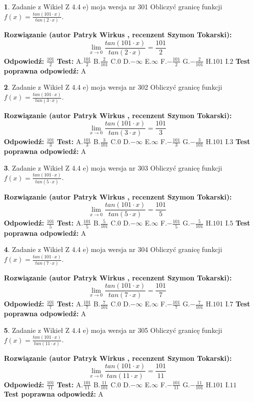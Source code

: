 \documentclass[12pt, a4paper]{article}
\theoremstyle{definition} %
\newtheorem{zad}{}
\newcommand{\zadStart}[1]{\begin{zad}#1\newline}
\newcommand{\zadStop}{\end{zad}}
\newcommand{\rozwStart}[2]{\noindent \textbf{Rozwiązanie (autor #1 , recenzent #2): }\newline}
\newcommand{\rozwStop}{\newline}
\newcommand{\odpStart}{\noindent \textbf{Odpowiedź:}\newline}
\newcommand{\odpStop}{\newline}
\newcommand{\testStart}{\noindent \textbf{Test:}\newline}
\newcommand{\testStop}{\newline}
\newcommand{\kluczStart}{\noindent \textbf{Test poprawna odpowiedź:}\newline}
\newcommand{\kluczStop}{\newline}
\begin{document}
\zadStart{Zadanie z Wikieł Z 4.4 e) moja wersja nr 301}
Obliczyć granicę funkcji $f(x)=\frac{tan(101\cdot x)}{tan(2\cdot x)}$.
\zadStop
\rozwStart{Patryk Wirkus}{Szymon Tokarski}
$$\lim\limits_{x\to 0}\frac{tan(101\cdot x)}{tan(2\cdot x)}=
\frac{101}{2}$$
\rozwStop
\odpStart
$\frac{101}{2}$
\odpStop
\testStart
A.$\frac{101}{2}$
B.$\frac{2}{101}$
C.$0$
D.$-\infty$
E.$\infty$
F.$-\frac{101}{2}$
G.$-\frac{2}{101}$
H.$101$
I.$2$
\testStop
\kluczStart
A
\kluczStop



\zadStart{Zadanie z Wikieł Z 4.4 e) moja wersja nr 302}
Obliczyć granicę funkcji $f(x)=\frac{tan(101\cdot x)}{tan(3\cdot x)}$.
\zadStop
\rozwStart{Patryk Wirkus}{Szymon Tokarski}
$$\lim\limits_{x\to 0}\frac{tan(101\cdot x)}{tan(3\cdot x)}=
\frac{101}{3}$$
\rozwStop
\odpStart
$\frac{101}{3}$
\odpStop
\testStart
A.$\frac{101}{3}$
B.$\frac{3}{101}$
C.$0$
D.$-\infty$
E.$\infty$
F.$-\frac{101}{3}$
G.$-\frac{3}{101}$
H.$101$
I.$3$
\testStop
\kluczStart
A
\kluczStop



\zadStart{Zadanie z Wikieł Z 4.4 e) moja wersja nr 303}
Obliczyć granicę funkcji $f(x)=\frac{tan(101\cdot x)}{tan(5\cdot x)}$.
\zadStop
\rozwStart{Patryk Wirkus}{Szymon Tokarski}
$$\lim\limits_{x\to 0}\frac{tan(101\cdot x)}{tan(5\cdot x)}=
\frac{101}{5}$$
\rozwStop
\odpStart
$\frac{101}{5}$
\odpStop
\testStart
A.$\frac{101}{5}$
B.$\frac{5}{101}$
C.$0$
D.$-\infty$
E.$\infty$
F.$-\frac{101}{5}$
G.$-\frac{5}{101}$
H.$101$
I.$5$
\testStop
\kluczStart
A
\kluczStop



\zadStart{Zadanie z Wikieł Z 4.4 e) moja wersja nr 304}
Obliczyć granicę funkcji $f(x)=\frac{tan(101\cdot x)}{tan(7\cdot x)}$.
\zadStop
\rozwStart{Patryk Wirkus}{Szymon Tokarski}
$$\lim\limits_{x\to 0}\frac{tan(101\cdot x)}{tan(7\cdot x)}=
\frac{101}{7}$$
\rozwStop
\odpStart
$\frac{101}{7}$
\odpStop
\testStart
A.$\frac{101}{7}$
B.$\frac{7}{101}$
C.$0$
D.$-\infty$
E.$\infty$
F.$-\frac{101}{7}$
G.$-\frac{7}{101}$
H.$101$
I.$7$
\testStop
\kluczStart
A
\kluczStop



\zadStart{Zadanie z Wikieł Z 4.4 e) moja wersja nr 305}
Obliczyć granicę funkcji $f(x)=\frac{tan(101\cdot x)}{tan(11\cdot x)}$.
\zadStop
\rozwStart{Patryk Wirkus}{Szymon Tokarski}
$$\lim\limits_{x\to 0}\frac{tan(101\cdot x)}{tan(11\cdot x)}=
\frac{101}{11}$$
\rozwStop
\odpStart
$\frac{101}{11}$
\odpStop
\testStart
A.$\frac{101}{11}$
B.$\frac{11}{101}$
C.$0$
D.$-\infty$
E.$\infty$
F.$-\frac{101}{11}$
G.$-\frac{11}{101}$
H.$101$
I.$11$
\testStop
\kluczStart
A
\kluczStop
\end{document}
